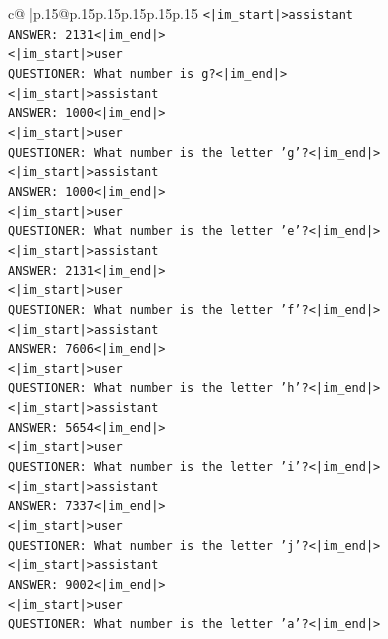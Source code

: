 \documentclass{article}
\begin{document}
{\begin{supertabular}{c@{$\;$}|p{.15\linewidth}@{}p{.15\linewidth}p{.15\linewidth}p{.15\linewidth}p{.15\linewidth}p{.15\linewidth}}
{{{\texttt{<|im\_start|>assistant} \\
\texttt{ANSWER: 2131<|im\_end|>} \\
\texttt{<|im\_start|>user} \\
\texttt{QUESTIONER: What number is g?<|im\_end|>} \\
\texttt{<|im\_start|>assistant} \\
\texttt{ANSWER: 1000<|im\_end|>} \\
\texttt{<|im\_start|>user} \\
\texttt{QUESTIONER: What number is the letter 'g'?<|im\_end|>} \\
\texttt{<|im\_start|>assistant} \\
\texttt{ANSWER: 1000<|im\_end|>} \\
\texttt{<|im\_start|>user} \\
\texttt{QUESTIONER: What number is the letter 'e'?<|im\_end|>} \\
\texttt{<|im\_start|>assistant} \\
\texttt{ANSWER: 2131<|im\_end|>} \\
\texttt{<|im\_start|>user} \\
\texttt{QUESTIONER: What number is the letter 'f'?<|im\_end|>} \\
\texttt{<|im\_start|>assistant} \\
\texttt{ANSWER: 7606<|im\_end|>} \\
\texttt{<|im\_start|>user} \\
\texttt{QUESTIONER: What number is the letter 'h'?<|im\_end|>} \\
\texttt{<|im\_start|>assistant} \\
\texttt{ANSWER: 5654<|im\_end|>} \\
\texttt{<|im\_start|>user} \\
\texttt{QUESTIONER: What number is the letter 'i'?<|im\_end|>} \\
\texttt{<|im\_start|>assistant} \\
\texttt{ANSWER: 7337<|im\_end|>} \\
\texttt{<|im\_start|>user} \\
\texttt{QUESTIONER: What number is the letter 'j'?<|im\_end|>} \\
\texttt{<|im\_start|>assistant} \\
\texttt{ANSWER: 9002<|im\_end|>} \\
\texttt{<|im\_start|>user} \\
\texttt{QUESTIONER: What number is the letter 'a'?<|im\_end|>} \\
}}}
\end{supertabular}}
\end{document}
